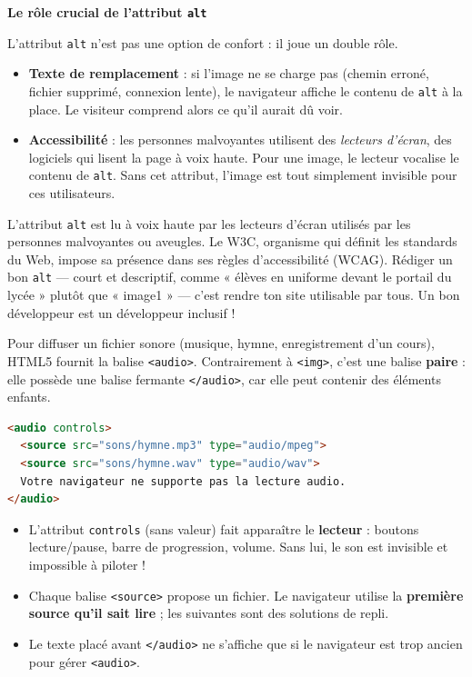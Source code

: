 \documentclass[11pt]{article}
\newcounter{popsec}
\newcounter{popsub}
\newcommand{\courssub}[1]{%
  \stepcounter{popsub}%
  \par\vspace{9pt}\noindent{\popxbold\fontsize{11.5}{13}\selectfont\color{popink}{\color{poporange}\thepopsec.\thepopsub}\hspace{6pt}#1}\par\nopagebreak\vspace{4pt}
}
\begin{document}
\textbf{Le rôle crucial de l'attribut \texttt{alt}}\par

L'attribut \texttt{alt} n'est pas une option de confort : il joue un double rôle.

\begin{itemize}
  \item \textbf{Texte de remplacement} : si l'image ne se charge pas (chemin erroné, fichier supprimé, connexion lente), le navigateur affiche le contenu de \texttt{alt} à la place. Le visiteur comprend alors ce qu'il aurait dû voir.
  \item \textbf{Accessibilité} : les personnes malvoyantes utilisent des \emph{lecteurs d'écran}, des logiciels qui lisent la page à voix haute. Pour une image, le lecteur vocalise le contenu de \texttt{alt}. Sans cet attribut, l'image est tout simplement invisible pour ces utilisateurs.
\end{itemize}

\begin{savaistu}
L'attribut \texttt{alt} est lu à voix haute par les lecteurs d'écran utilisés par les personnes malvoyantes ou aveugles. Le W3C, organisme qui définit les standards du Web, impose sa présence dans ses règles d'accessibilité (WCAG). Rédiger un bon \texttt{alt} — court et descriptif, comme « élèves en uniforme devant le portail du lycée » plutôt que « image1 » — c'est rendre ton site utilisable par tous. Un bon développeur est un développeur inclusif !
\end{savaistu}

\courssub{Insérer un son : la balise \texttt{<audio>}}

Pour diffuser un fichier sonore (musique, hymne, enregistrement d'un cours), HTML5 fournit la balise \texttt{<audio>}. Contrairement à \texttt{<img>}, c'est une balise \textbf{paire} : elle possède une balise fermante \texttt{</audio>}, car elle peut contenir des éléments enfants.

\begin{propriete}
\begin{lstlisting}[language=HTML]
<audio controls>
  <source src="sons/hymne.mp3" type="audio/mpeg">
  <source src="sons/hymne.wav" type="audio/wav">
  Votre navigateur ne supporte pas la lecture audio.
</audio>
\end{lstlisting}
\begin{itemize}
  \item L'attribut \texttt{controls} (sans valeur) fait apparaître le \textbf{lecteur} : boutons lecture/pause, barre de progression, volume. Sans lui, le son est invisible et impossible à piloter !
  \item Chaque balise \texttt{<source>} propose un fichier. Le navigateur utilise la \textbf{première source qu'il sait lire} ; les suivantes sont des solutions de repli.
  \item Le texte placé avant \texttt{</audio>} ne s'affiche que si le navigateur est trop ancien pour gérer \texttt{<audio>}.
\end{itemize}
\end{propriete}
\end{document}
